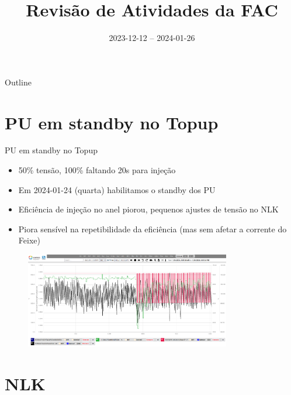 \documentclass{beamer}					  %
\title{Revisão de Atividades da FAC}	%
\institute{LNLS.DAC.FAC}				%
\date{2023-12-12 -- 2024-01-26}			%
\begin{document}
\begin{frame}
  \titlepage
  \href{https://github.com/lnls-fac/doc-review-dac-fac}{}
  \href{https://www.overleaf.com/read/sbdjxtzfchrm}{}
\end{frame}

\begin{frame}{Outline}
  \tableofcontents
\end{frame}


\section{PU em standby no Topup}

\begin{frame}{PU em standby no Topup}
    \scriptsize{\begin{itemize}
            \item 50\% tensão, 100\% faltando 20s para injeção
    		\item Em 2024-01-24 (quarta) habilitamos o standby dos PU
            \item Eficiência de injeção no anel piorou, pequenos ajustes de tensão no NLK
            \item Piora sensível na repetibilidade da eficiência (mas sem afetar a corrente do Feixe)
    \end{itemize}}
    \begin{figure}[H]
        	\centering
            \includegraphics[width=0.8\textwidth]{2024-01-26/figures/pu-standby.png}
            \label{fig:pu-standby}
    \end{figure} 
\end{frame}


\section{NLK}
\end{document}
